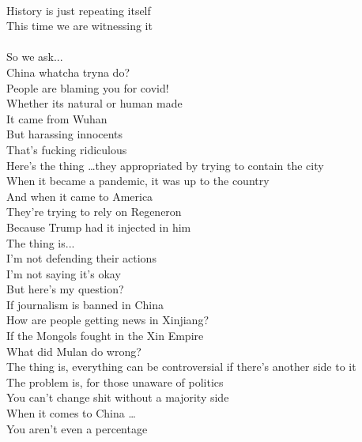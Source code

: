 \documentclass[12pt, b5paper, oneside]{book}
\begin{document}
\\History is just repeating itself
\\This time we are witnessing it
%
\\\\So we ask...
\\China whatcha tryna do?
\\People are blaming you for covid!
\\Whether its natural or human made
\\It came from Wuhan
\\But harassing innocents
\\That's fucking ridiculous
%
\\Here's the thing \dots they appropriated by trying to contain the city
\\When it became a pandemic, it was up to the country
\\And when it came to America
\\They're trying to rely on Regeneron
\\Because Trump had it injected in him
\\The thing is...
\\I'm not defending their actions
\\I'm not saying it's okay
\\But here's my question?
\\If journalism is banned in China
\\How are people getting news in Xinjiang?
\\If the Mongols fought in the Xin Empire
\\What did Mulan do wrong?
\\The thing is, everything can be controversial if there's another side to it
\\The problem is, for those unaware of politics
\\You can't change shit without a majority side
\\When it comes to China \dots 
\\You aren't even a percentage 
\newpage
\end{document}
